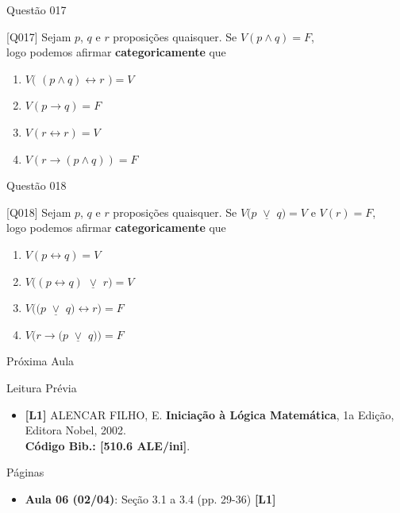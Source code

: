 \documentclass[xcolor=dvipsnames,table]{beamer}
\begin{document}
\begin{frame}{Questão 017}
\begin{block}{[Q017]}
	Sejam $p$, $q$ e $r$ proposições quaisquer. Se $V(p \wedge q) = F$, \\
	logo podemos afirmar {\bf categoricamente} que
\end{block}
\begin{enumerate}[label=(\Alph*)]
	\item $V($ $(p \wedge q) \leftrightarrow r$ $) = V$
	\item $V(p \rightarrow q) = F$
	\item $V(r \leftrightarrow r) = V$
	\item $V(r \rightarrow (p \wedge q)) = F$
\end{enumerate}
\end{frame}

\begin{frame}{Questão 018}
\begin{block}{[Q018]}
	Sejam $p$, $q$ e $r$ proposições quaisquer. Se $V(p$ $\underline{\vee}$ $q) = V$ e $V(r) = F$, \\
	logo podemos afirmar {\bf categoricamente} que
\end{block}
\begin{enumerate}[label=(\Alph*)]
	\item $V(p \leftrightarrow q) = V$
	\item $V\big((p \leftrightarrow q) $ $\underline{\vee}$ $ r\big) = V$
	\item $V\big((p$ $\underline{\vee}$ $q) \leftrightarrow r\big) = F$
	\item $V\big(r \rightarrow (p$ $\underline{\vee}$ $q)\big) = F$
\end{enumerate}
\end{frame}

\begin{frame}{Próxima Aula}
    \begin{block}{Leitura Prévia}
        \begin{itemize}
            \item {\bf \color{blue} [L1]} ALENCAR FILHO, E. {\bf Iniciação à Lógica Matemática}, 1a Edição, Editora Nobel, 2002. \\{\color{blue} \bf Código Bib.: [510.6 ALE/ini]}.
        \end{itemize}
    \end{block}
    \begin{block}{Páginas}
        \begin{itemize}
        \item {\bf Aula 06 (02/04)}: Seção 3.1 a 3.4 (pp. 29-36) {\bf \color{blue} [L1]} 
        \end{itemize}
    \end{block}
\end{frame}
	
	\begin{frame}
		\titlepage
	\end{frame}
	
\end{document}
